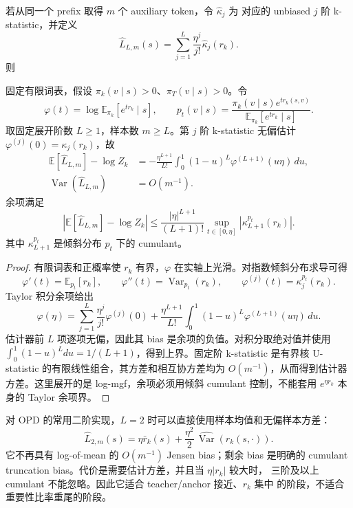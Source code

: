 若从同一个 prefix 取得 $m$ 个 auxiliary token，令 $\widehat\kappa_j$ 为
对应的 unbiased $j$ 阶 k-statistic，并定义
\begin{equation}
\widehat L_{L,m}(s)=\sum_{j=1}^{L}\frac{\eta^j}{j!}\widehat\kappa_j(r_k).
\label{eq:ch2-opd-logz-kstat-estimator}
\end{equation}
则
\begin{theorem}
\label{thm:ch2-opd-logz-cumulant}
固定有限词表，假设 $\pi_k(v\mid s)>0$、$\pi_T(v\mid s)>0$。令
\[
\varphi(t)=\log\mathbb E_{\pi_k}[e^{t r_k}\mid s],\qquad
p_t(v\mid s)=\frac{\pi_k(v\mid s)e^{t r_k(s,v)}}{\mathbb E_{\pi_k}[e^{t r_k}\mid s]}.
\]
取固定展开阶数 $L\ge1$，样本数 $m\ge L$。第 $j$ 阶 k-statistic 无偏估计 $\varphi^{(j)}(0)=\kappa_j(r_k)$，故
\begin{align}
\mathbb E[\widehat L_{L,m}]-\log Z_k
&=-\frac{\eta^{L+1}}{L!}\int_0^1(1-u)^L\varphi^{(L+1)}(u\eta)\,du,\\
\operatorname{Var}(\widehat L_{L,m})&=O(m^{-1}).
\end{align}
余项满足
\begin{equation}
\left|\mathbb E[\widehat L_{L,m}]-\log Z_k\right|
\le\frac{|\eta|^{L+1}}{(L+1)!}\sup_{t\in[0,\eta]}\left|\kappa_{L+1}^{p_t}(r_k)\right|.
\end{equation}
其中 $\kappa_{L+1}^{p_t}$ 是倾斜分布 $p_t$ 下的 cumulant。
\end{theorem}
\begin{proof}
有限词表和正概率使 $r_k$ 有界，$\varphi$ 在实轴上光滑。对指数倾斜分布求导可得
\[
\varphi'(t)=\mathbb E_{p_t}[r_k],\qquad
\varphi''(t)=\operatorname{Var}_{p_t}(r_k),\qquad
\varphi^{(j)}(t)=\kappa_j^{p_t}(r_k).
\]
Taylor 积分余项给出
\[
\varphi(\eta)=\sum_{j=1}^{L}\frac{\eta^j}{j!}\varphi^{(j)}(0)
+\frac{\eta^{L+1}}{L!}\int_0^1(1-u)^L\varphi^{(L+1)}(u\eta)\,du.
\]
估计器前 $L$ 项逐项无偏，因此其 bias 是余项的负值。对积分取绝对值并使用 $\int_0^1(1-u)^Ldu=1/(L+1)$，得到上界。固定阶 k-statistic 是有界核 U-statistic 的有限线性组合，其方差和相互协方差均为 $O(m^{-1})$，从而得到估计器方差。这里展开的是 log-mgf，余项必须用倾斜 cumulant 控制，不能套用 $e^{\eta r_k}$ 本身的 Taylor 余项界。
\end{proof}

对 OPD 的常用二阶实现，$L=2$ 时可以直接使用样本均值和无偏样本方差：
\begin{equation}
\widehat L_{2,m}(s)=\eta\bar r_k(s)
 +\frac{\eta^2}{2}\,\widehat{\operatorname{Var}}(r_k(s,\cdot)).
\label{eq:ch2-opd-logz-second-estimator}
\end{equation}
它不再具有 log-of-mean 的 $O(m^{-1})$ Jensen bias；剩余 bias 是明确的
cumulant truncation bias。代价是需要估计方差，并且当 $\eta|r_k|$ 较大时，
三阶及以上 cumulant 不能忽略。因此它适合 teacher/anchor 接近、$r_k$ 集中
的阶段，不适合重要性比率重尾的阶段。

